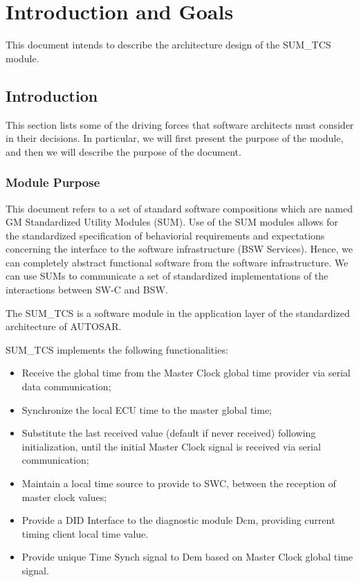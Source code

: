 \chapter{Introduction and Goals}

This document intends to describe the architecture design of the SUM_TCS module.

\section{Introduction}
This section lists some of the driving forces that software architects must consider in their decisions. In particular, we will first present the purpose of the module, and then we will describe the purpose of the document.

\subsection{Module Purpose}

This document refers to a set of standard software compositions which are named GM Standardized Utility Modules (SUM).
Use of the SUM modules allows for the standardized specification of behaviorial requirements and expectations concerning the interface to the software infrastructure (BSW Services).
Hence, we can completely abstract functional software from the software infrastructure.
We can use SUMs to communicate a set of standardized implementations of the interactions between SW-C and BSW.

The SUM_TCS is a software module in the application layer of the standardized architecture of AUTOSAR.

SUM_TCS implements the following functionalities:

\begin{itemize}
	\item Receive the global time from the Master Clock global time provider via serial data communication;
	\item Synchronize the local ECU time to the master global time;
	\item Substitute the last received value (default if never received) following initialization, until the initial Master Clock signal is received via serial communication;
	\item Maintain a local time source to provide to SWC, between the reception of master clock values;
	\item Provide a DID Interface to the diagnostic module Dcm, providing current timing client local time value.
	\item Provide unique Time Synch signal to Dem based on Master Clock global time signal.
\end{itemize}

